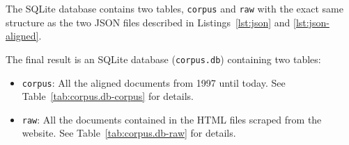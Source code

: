 The SQLite database contains two tables, \texttt{corpus} and \texttt{raw} with the exact same structure as the two JSON files described in Listings~\ref{lst:json} and \ref{lst:json-aligned}.

The final result is an SQLite database (\texttt{corpus.db}) containing two tables:
\begin{itemize}
	\item \texttt{corpus}: All the aligned documents from 1997 until today. See Table~\ref{tab:corpus.db-corpus} for details.




	\item \texttt{raw}: All the documents contained in the HTML files scraped from the website. 
	See Table~\ref{tab:corpus.db-raw} for details. 
\end{itemize}



